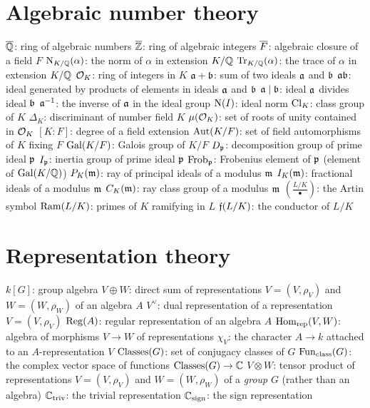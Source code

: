 \section{Algebraic number theory}
\begin{itemize}
	\ii $\overline {\mathbb Q}$: ring of algebraic numbers
	\ii $\overline {\mathbb Z}$: ring of algebraic integers
	\ii $\overline F$: algebraic closure of a field $F$
	\ii $\operatorname{N}_{K/\mathbb Q}(\alpha)$: the norm of $\alpha$ in extension $K/\mathbb Q$
	\ii $\operatorname{Tr}_{K/\mathbb Q}(\alpha)$: the trace of $\alpha$ in extension $K/\mathbb Q$
	\ii $\mathcal O_K$: ring of integers in $K$
	\ii $\mathfrak a+\mathfrak b$: sum of two ideals $\mathfrak a$ and $\mathfrak b$
	\ii $\mathfrak a\mathfrak b$: ideal generated by products of elements in ideals $\mathfrak a$ and $\mathfrak b$
	\ii $\mathfrak a \mid \mathfrak b$: ideal $\mathfrak a$ divides ideal $\mathfrak b$
	\ii $\mathfrak a^{-1}$: the inverse of $\mathfrak a$ in the ideal group
	\ii $\operatorname{N}(I)$: ideal norm
	\ii $\mathrm{Cl}_K$: class group of $K$
	\ii $\Delta_K$: discriminant of number field $K$
	\ii $\mu(\mathcal O_K)$: set of roots of unity contained in $\mathcal O_K$
	\ii $[K:F]$: degree of a field extension
	\ii $\operatorname{Aut}(K/F)$: set of field automorphisms of $K$ fixing $F$
	\ii $\operatorname{Gal}(K/F)$: Galois group of $K/F$
	\ii $D_\mathfrak p$: decomposition group of prime ideal $\mathfrak p$
	\ii $I_\mathfrak p$: inertia group of prime ideal $\mathfrak p$
	\ii $\mathrm{Frob}_\mathfrak p$: Frobenius element of $\mathfrak p$ (element of $\operatorname{Gal}(K/\mathbb Q)$)
	\ii $P_K(\mathfrak m)$: ray of principal ideals of a modulus $\mathfrak m$
	\ii $I_K(\mathfrak m)$: fractional ideals of a modulus $\mathfrak m$
	\ii $C_K(\mathfrak m)$: ray class group of a modulus $\mathfrak m$
	\ii $\left( \frac{L/K}{\bullet} \right)$: the Artin symbol
	\ii $\operatorname{Ram}(L/K)$: primes of $K$ ramifying in $L$
	\ii $\mathfrak f(L/K)$: the conductor of $L/K$
\end{itemize}

\section{Representation theory}
\begin{itemize}
	\ii $k[G]$: group algebra
	\ii $V \oplus W$: direct sum of representations $V = (V, \rho_V)$
	and $W = (W, \rho_W)$ of an algebra $A$
	\ii $V^\vee$: dual representation of a representation $V = (V, \rho_V)$
	\ii $\operatorname{Reg}(A)$: regular representation of an algebra $A$
	\ii $\operatorname{Hom}_{\mathrm{rep}}(V,W)$: algebra of morphisms $V \to W$ of representations
	\ii $\chi_V$: the character $A \to k$ attached to an $A$-representation $V$
	\ii $\operatorname{Classes}(G)$: set of conjugacy classes of $G$
	\ii $\operatorname{Fun}_{\mathrm{class}}(G)$: the complex vector space of functions $\operatorname{Classes}(G) \to \mathbb C$
	\ii $V \otimes W$: tensor product of representations $V = (V, \rho_V)$ and $W = (W, \rho_W)$
	of a \emph{group} $G$ (rather than an algebra)
	\ii $\mathbb C_{\mathrm{triv}}$: the trivial representation
	\ii $\mathbb C_{\mathrm{sign}}$: the sign representation
\end{itemize}

